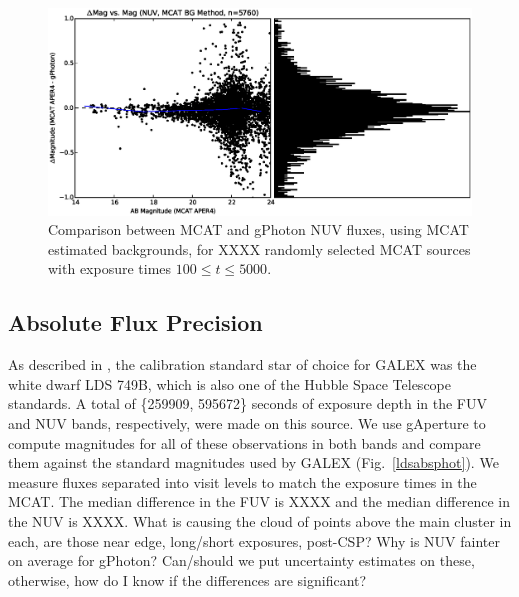 \documentclass[5p]{elsarticle}
\begin{document}
\begin{figure}
\includegraphics[scale=0.32]{FigRelPhotNUV-mcat_bg.eps}
\caption{Comparison between MCAT and gPhoton NUV fluxes, using MCAT estimated backgrounds, for {\color{red}XXXX} randomly selected MCAT sources with exposure times $100 \leq t \leq 5000$. \label{nuvrelphot}}
\end{figure}


\subsection{Absolute Flux Precision}
As described in \citet{mor2007}, the calibration standard star of choice for GALEX was the white dwarf LDS 749B, which is also one of the Hubble Space Telescope standards. A total of \{259909, 595672\} seconds of exposure depth in the FUV and NUV bands, respectively, were made on this source. We use gAperture to compute magnitudes for all of these observations in both bands and compare them against the standard magnitudes used by GALEX (Fig.\ \ref{ldsabsphot}).  We measure fluxes separated into visit levels to match the exposure times in the MCAT.  The median difference in the FUV is {\color{red}XXXX} and the median difference in the NUV is {\color{red}XXXX}.  {\color{red}What is causing the cloud of points above the main cluster in each, are those near edge, long/short exposures, post-CSP?  Why is NUV fainter on average for gPhoton?  Can/should we put uncertainty estimates on these, otherwise, how do I know if the differences are significant?}
\end{document}
